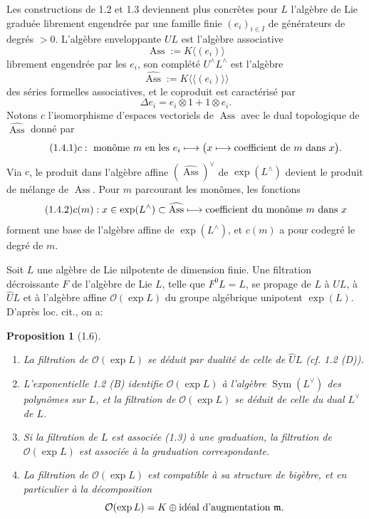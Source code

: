 \documentclass[10pt,a4paper]{article}
\newcommand{\Sym}{\operatorname{Sym}}
\newcommand{\Ass}{\operatorname{Ass}}
\newcommand{\OO}{\mathcal O}
\newcommand{\m}{\mathfrak m}
\newcommand{\Lhat}{L^{\wedge}}
\newcommand{\Uhat}{U^{\wedge}}
\theoremstyle{deligne}
\newtheorem*{proposition*}{Proposition}
\newcommand{\heading}[1]{\vspace{0.65em}\noindent{\bfseries #1}\quad}
\begin{document}
\heading{1.4.} Les constructions de 1.2 et 1.3 deviennent plus concrètes pour \(L\) l'algèbre de Lie graduée librement engendrée par une famille finie \((e_i)_{i\in I}\) de générateurs de degrés \(>0\). L'algèbre enveloppante \(UL\) est l'algèbre associative
\[
\Ass:=K\langle(e_i)\rangle
\]
librement engendrée par les \(e_i\), son complété \(\Uhat\Lhat\) est l'algèbre
\[
\widehat{\Ass}:=K\langle\!\langle(e_i)\rangle\!\rangle
\]
des séries formelles associatives, et le coproduit est caractérisé par
\[
\Delta e_i=e_i\otimes1+1\otimes e_i.
\]
Notons \(c\) l'isomorphisme d'espaces vectoriels de \(\Ass\) avec le dual topologique de \(\widehat{\Ass}\) donné par
\[
\tag{1.4.1}
c:\ \hbox{monôme }m\hbox{ en les }e_i\longmapsto
\bigl(x\longmapsto \hbox{coefficient de }m\hbox{ dans }x\bigr).
\]
Via \(c\), le produit dans l'algèbre affine \((\widehat{\Ass})^\vee\) de \(\exp(\Lhat)\) devient le produit de mélange de \(\Ass\). Pour \(m\) parcourant les monômes, les fonctions
\[
\tag{1.4.2}
c(m):x\in\exp(\Lhat)\subset\widehat{\Ass}\longmapsto
\hbox{coefficient du monôme }m\hbox{ dans }x
\]
forment une base de l'algèbre affine de \(\exp(\Lhat)\), et \(c(m)\) a pour codegré le degré de \(m\).

\heading{1.5 (cf. [1] A1 à A3).} Soit \(L\) une algèbre de Lie nilpotente de dimension finie. Une filtration décroissante \(F\) de l'algèbre de Lie \(L\), telle que \(F^0L=L\), se propage de \(L\) à \(UL\), à \(\widehat UL\) et à l'algèbre affine \(\OO(\exp L)\) du groupe algébrique unipotent \(\exp(L)\). D'après loc. cit., on a:

\begin{proposition*}[1.6]
\begin{enumerate}[label=(\roman*)]
\item La filtration de \(\OO(\exp L)\) se déduit par dualité de celle de \(\widehat UL\) (cf. 1.2 (D)).
\item L'exponentielle 1.2 (B) identifie \(\OO(\exp L)\) à l'algèbre \(\Sym(L^\vee)\) des polynômes sur \(L\), et la filtration de \(\OO(\exp L)\) se déduit de celle du dual \(L^\vee\) de \(L\).
\item Si la filtration de \(L\) est associée (1.3) à une graduation, la filtration de \(\OO(\exp L)\) est associée à la graduation correspondante.
\item La filtration de \(\OO(\exp L)\) est compatible à sa structure de bigèbre, et en particulier à la décomposition
\[
\OO(\exp L)=K\oplus \hbox{idéal d'augmentation }\m.
\]
\end{enumerate}
\end{proposition*}
\end{document}

